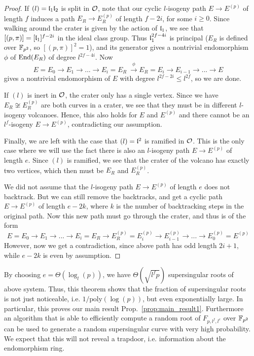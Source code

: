 \begin{proof}
    If $(l) = \mathfrak{l}_1 \mathfrak{l}_2$ is split in $\mathcal{O}$, note that our cyclic $l$-isogeny path $E \to E^{(p)}$ of length $f$ induces a path $E_R \to E_R^{(p)}$ of length $f - 2i$, for some $i \geq 0$.
    Since walking around the crater is given by the action of $\mathfrak{l}_1$, we see that $[(p, \pi)] = [\mathfrak{l}_1]^{f - 2i}$ in the ideal class group.
    Thus $\mathfrak{l}_1^{2f - 4i}$ is principal ($E_R$ is defined over $\mathbb{F}_{p^2}$, so $[(p, \pi)]^2 = 1$), and its generator gives a nontrivial endomorphism $\phi$ of $\mathrm{End}(E_R)$ of degree $l^{2f - 4i}$.
    Now
    \begin{equation*}
        E = E_0 \to E_1 \to ... \to E_i = E_R \ \overset{\phi}{\longrightarrow} E_R = E_i \to E_{i - 1} \to ... \to E
    \end{equation*}
    gives a nontrivial endomorphism of $E$ with degree $l^{2f - 2i} \leq l^{2f}$, so we are done.

    If $(l)$ is inert in $\mathcal{O}$, the crater only has a single vertex.
    Since we have $E_R \not\cong E_R^{(p)}$ are both curves in a crater, we see that they must be in different $l$-isogeny volcanoes.
    Hence, this also holds for $E$ and $E^{(p)}$ and there cannot be an $l^f$-isogeny $E \to E^{(p)}$, contradicting our assumption.

    Finally, we are left with the case that $(l) = \mathfrak{l}^2$ is ramified in $\mathcal{O}$.
    This is the only case where we will use the fact there is also an $l$-isogeny path $E \to E^{(p)}$ of length $e$.
    Since $(l)$ is ramified, we see that the crater of the volcano has exactly two vertices, which then must be $E_R$ and $E_R^{(p)}$.

    We did not assume that the $l$-isogeny path $E \to E^{(p)}$ of length $e$ does not backtrack.
    But we can still remove the backtracks, and get a cyclic path $E \to E^{(p)}$ of length $e - 2k$, where $k$ is the number of backtracking steps in the original path.
    Now this new path must go through the crater, and thus is of the form
    \begin{equation*}
        E = E_0 \to E_1 \to ... \to E_i = E_R \to E_R^{(p)} = E_i^{(p)} \to E_{i - 1}^{(p)} \to ... \to E_0^{(p)} = E^{(p)}
    \end{equation*}
    However, now we get a contradiction, since above path has odd length $2i + 1$, while $e - 2k$ is even by assumption.
\end{proof}
By choosing $e = \Theta(\log_l(p))$, we have $\Theta(\sqrt{l^fp})$ supersingular roots of above system.
Thus, this theorem shows that the fraction of supersingular roots is not just noticeable, i.e. $1/\mathrm{poly}(\log(p))$, but even exponentially large.
In particular, this proves our main result Prop.~\ref{prop:main_result1}.
Furthermore an algorithm that is able to efficiently compute a random root of $F_{p, l^f, l^e}$ over $\mathbb{F}_{p^2}$ can be used to generate a random supersingular curve with very high probability.
We expect that this will not reveal a trapdoor, i.e. information about the endomorphism ring.

